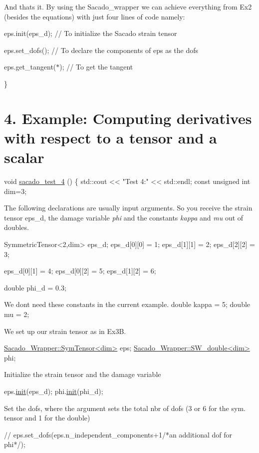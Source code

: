 And that\textquotesingle{}s it. By using the Sacado\+\_\+wrapper we can achieve everything from Ex2 (besides the equations) with just four lines of code namely\+:
\begin{DoxyItemize}
\item eps.\+init(eps\+\_\+d); // To initialize the Sacado strain tensor
\item eps.\+set\+\_\+dofs(); // To declare the components of eps as the dofs
\item eps.\+get\+\_\+tangent($\ast$); // To get the tangent 
\begin{DoxyCode}
\}
\end{DoxyCode}
 
\end{DoxyItemize}\hypertarget{index_Ex4}{}\section{4. Example\+: Computing derivatives with respect to a tensor and a scalar}\label{index_Ex4}

\begin{DoxyCode}
\textcolor{keywordtype}{void} \hyperlink{Sacado__example_8cc_a2f4def4563e31d720e07bc7d6363ebe2}{sacado\_test\_4} ()
\{
    std::cout << \textcolor{stringliteral}{"Test 4:"} << std::endl;
    \textcolor{keyword}{const} \textcolor{keywordtype}{unsigned} \textcolor{keywordtype}{int} dim=3;
\end{DoxyCode}
 The following declarations are usually input arguments. So you receive the strain tensor  eps\+\_\+d, the damage variable {\itshape phi} and the constants {\itshape kappa} and {\itshape mu} out of doubles. 
\begin{DoxyCode}
SymmetricTensor<2,dim> eps\_d;
eps\_d[0][0] = 1;
eps\_d[1][1] = 2;
eps\_d[2][2] = 3;

eps\_d[0][1] = 4;
eps\_d[0][2] = 5;
eps\_d[1][2] = 6;

\textcolor{keywordtype}{double} phi\_d = 0.3;
\end{DoxyCode}
 We don\textquotesingle{}t need these constants in the current example. double kappa = 5; double mu = 2;

We set up our strain tensor as in Ex3B. 
\begin{DoxyCode}
\hyperlink{classSacado__Wrapper_1_1SymTensor}{Sacado\_Wrapper::SymTensor<dim>} eps;
\hyperlink{classSacado__Wrapper_1_1SW__double}{Sacado\_Wrapper::SW\_double<dim>} phi;
\end{DoxyCode}
 Initialize the strain tensor and the damage variable 
\begin{DoxyCode}
eps.\hyperlink{classSacado__Wrapper_1_1SymTensor_acbad579d5ead9e96ff46aa15d9b5aef4}{init}(eps\_d);
phi.\hyperlink{classSacado__Wrapper_1_1SW__double_adca799dd92dadebda9aebc91c797682a}{init}(phi\_d);
\end{DoxyCode}
 Set the dofs, where the argument sets the total nbr of dofs (3 or 6 for the sym. tensor and 1 for the double) 
\begin{DoxyCode}
\textcolor{comment}{//    eps.set\_dofs(eps.n\_independent\_components+1/*an additional dof for phi*/);}
\end{DoxyCode}


